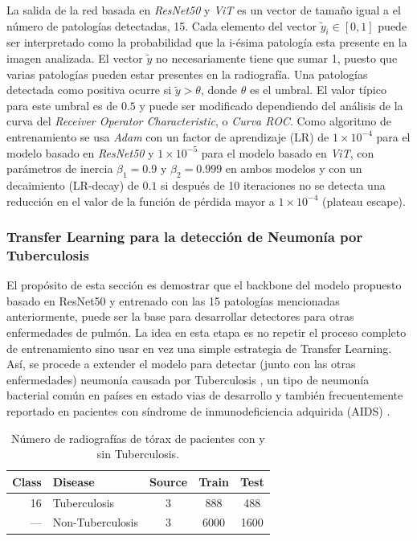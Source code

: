 {La salida de la red basada en \textit{ResNet50} y \textit{ViT} es un vector de tamaño igual a el
número de patologías detectadas, 15. Cada
elemento del vector $\tilde y_i \in [0,1]$ puede ser interpretado como la probabilidad que la
i-ésima patología esta presente en la imagen analizada. El vector $\tilde y$ no necesariamente tiene
que sumar 1, puesto que varias patologías pueden estar presentes en la radiografía. Una patologías
detectada como positiva ocurre si  $\tilde y > \theta$, donde $\theta$ es el umbral. El valor típico
para este umbral es de $0.5$ y puede ser modificado dependiendo del análisis de la curva del
\textit{Receiver Operator Characteristic}, o \textit{Curva ROC}. Como algoritmo de entrenamiento se
usa \emph{Adam}
\cite{kingma2017adam} con un factor de aprendizaje (LR) de $1\times 10^{-4}$ para el modelo basado
en \textit{ResNet50} y $1\times 10^{-5}$ para el modelo basado en \textit{ViT}, con parámetros de inercia
$\beta_1=0.9$ y $\beta_2=0.999$ en ambos modelos y con un decaimiento (LR-decay) de $0.1$ si después de 10 iteraciones
no se detecta una reducción en el valor de la función de pérdida mayor a $1\times 10^{-4}$ (plateau
escape).

\subsubsection{Transfer Learning para la detección de Neumonía por Tuberculosis}

El propósito de esta sección es demostrar que el backbone del  modelo propuesto basado en ResNet50
y entrenado con las 15 patologías mencionadas anteriormente, puede ser la base para desarrollar
detectores para otras enfermedades de pulmón. La idea en esta etapa es no repetir el proceso
completo de entrenamiento sino usar en vez una simple estrategia de Transfer Learning. Así, se
procede a extender el modelo para detectar (junto con las otras enfermedades) neumonía causada por
Tuberculosis \cite{stirenko2018chest}, un tipo de neumonía bacterial común en países en estado vias
de desarrollo y también frecuentemente reportado en pacientes con síndrome de inmunodeficiencia
adquirida (AIDS) \cite{matsuura2018tuberculous}.

\begin{table}[!ht]
    \centering
    \begin{tabular}{| r |l | c | c | c |}
     \hline
     Class & Disease & Source & Train & Test  \\
     \hline\hline
     16  & Tuberculosis        & 3 & 888   & 488  \\
     ---&  Non-Tuberculosis     & 3 & 6000  & 1600 \\
     \hline
    \end{tabular}
    \caption{ Número de radiografías de tórax de pacientes con y sin Tuberculosis.}
\label{table_dataset_tb}
\end{table}

}
